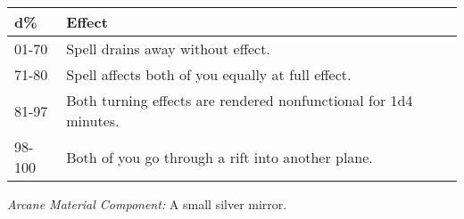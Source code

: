 \begin{longtable}{llll}
\hline
\multicolumn{1}{|p{0.567in}|}{\begin{minipage}[t]{0.567in}\raggedright
\textbf{d\%}\end{minipage}} & \multicolumn{1}{p{3.741in}|}{\begin{minipage}[t]{3.741in}\raggedright
\textbf{Effect}\end{minipage}}\\
\hline
\multicolumn{1}{p{0.069in}|}{\begin{minipage}[t]{0.069in}\raggedright
01-70\end{minipage}} & \multicolumn{1}{p{0.069in}|}{\begin{minipage}[t]{0.069in}\raggedright
Spell drains away without effect.\end{minipage}}\\
\hline
\multicolumn{1}{|p{0.567in}|}{\begin{minipage}[t]{0.567in}\raggedright
71-80\end{minipage}} & \multicolumn{1}{p{3.741in}|}{\begin{minipage}[t]{3.741in}\raggedright
Spell affects both of you equally at full effect.\end{minipage}}\\
\hline
\multicolumn{1}{p{0.069in}|}{\begin{minipage}[t]{0.069in}\raggedright
81-97\end{minipage}} & \multicolumn{1}{p{0.069in}|}{\begin{minipage}[t]{0.069in}\raggedright
Both turning effects are rendered nonfunctional for 1d4 minutes.\end{minipage}}\\
\hline
\multicolumn{1}{|p{0.567in}|}{\begin{minipage}[t]{0.567in}\raggedright
98-100\end{minipage}} & \multicolumn{3}{p{3.880in}|}{\begin{minipage}[t]{3.880in}\raggedright
Both of you go through a rift into another plane.\end{minipage}}\\
\hline
\end{longtable}

\textit{Arcane Material Component:} A small silver mirror.


